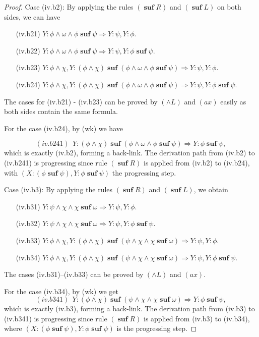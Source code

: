 \documentclass[manuscript,screen]{acmart}
\DeclareMathOperator{\osuf}{\mathbf{suf}}
\begin{document}
\begin{proof}
Case (iv.b2):
By applying the rules $(\osuf R)$ and $(\osuf L)$ on both sides, we can have
\begin{enumerate}
\item[(iv.b21)] $Y : \phi\wedge \omega\wedge \phi\osuf\psi\Rightarrow Y : \psi, Y : \phi$.
\item[(iv.b22)] $Y : \phi\wedge \omega\wedge \phi\osuf\psi\Rightarrow Y : \psi, Y : \phi\osuf \psi$.
\item[(iv.b23)] $Y : \phi\wedge \chi, Y : (\phi\wedge \chi)\osuf(\phi\wedge\omega\wedge\phi\osuf\psi)\Rightarrow Y : \psi, Y : \phi$.
\item[(iv.b24)] $Y : \phi\wedge \chi, Y : (\phi\wedge \chi)\osuf(\phi\wedge\omega\wedge\phi\osuf\psi)\Rightarrow Y : \psi, Y : \phi\osuf\psi$.
\end{enumerate}
The cases for (iv.b21) - (iv.b23) can be proved by $(\wedge L)$ and $(ax)$ easily as both sides contain the same formula. 

For the case (iv.b24), by (wk) we have

$$
(iv.b241)\ \ Y : (\phi\wedge\chi)\osuf (\phi\wedge \omega\wedge \phi\osuf \psi) \Rightarrow Y : \phi\osuf \psi, 
$$
which is exactly (iv.b2), forming a back-link.
The derivation path from (iv.b2) to (iv.b241) is progressing since rule $(\osuf R)$ is applied from (iv.b2) to (iv.b24), with $(X : (\phi\osuf\psi), Y : \phi\osuf \psi)$ the progressing step.  

Case (iv.b3): 
By applying the rules $(\osuf R)$ and $(\osuf L)$, we obtain
\begin{enumerate}
\item[(iv.b31)] $Y : \psi\wedge\chi\wedge \chi\osuf\omega\Rightarrow Y : \psi, Y : \phi$.
\item[(iv.b32)] $Y : \psi\wedge\chi\wedge \chi\osuf\omega\Rightarrow Y : \psi, Y : \phi\osuf \psi$.
\item[(iv.b33)] $Y : \phi\wedge\chi, Y : (\phi\wedge \chi)\osuf (\psi\wedge\chi\wedge \chi\osuf\omega)\Rightarrow Y : \psi, Y : \phi$.
\item[(iv.b34)] $Y : \phi\wedge\chi, Y : (\phi\wedge \chi)\osuf (\psi\wedge\chi\wedge \chi\osuf\omega)\Rightarrow Y : \psi, Y : \phi\osuf \psi$.
\end{enumerate}
The cases (iv.b31)--(iv.b33) can be proved by $(\wedge L)$ and $(ax)$. 

For the case (iv.b34), by (wk) we get
$$
(iv.b341)\ \ Y : (\phi\wedge\chi)\osuf (\psi\wedge \chi\wedge \chi\osuf\omega) \Rightarrow Y : \phi\osuf \psi, 
$$
which is exactly (iv.b3), forming a back-link.
The derivation path from (iv.b3) to (iv.b341) is progressing since rule $(\osuf R)$ is applied from (iv.b3) to (iv.b34), where $(X : (\phi\osuf\psi), Y : \phi\osuf \psi)$ is the progressing step.  


\end{proof}
\end{document}
